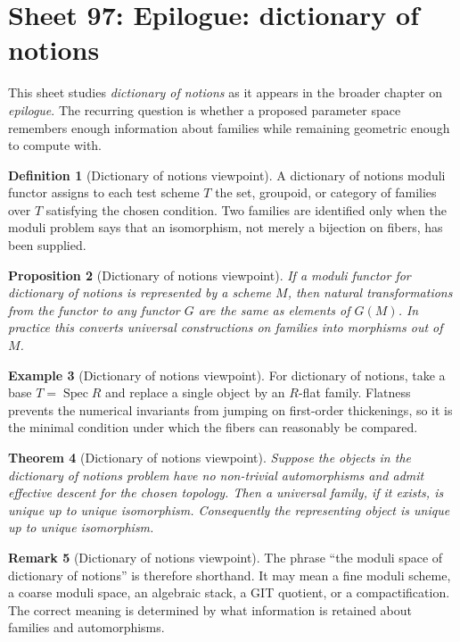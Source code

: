 \documentclass[11pt]{amsart}
\newtheorem{theorem}{Theorem}[section]
\newtheorem{proposition}[theorem]{Proposition}
\theoremstyle{definition}
\newtheorem{definition}[theorem]{Definition}
\newtheorem{example}[theorem]{Example}
\newtheorem{remark}[theorem]{Remark}
\newcommand{\Spec}{\operatorname{Spec}}
\begin{document}
\section{Sheet 97: Epilogue: dictionary of notions}
This sheet studies \emph{dictionary of notions} as it appears in the broader chapter on \emph{epilogue}.  The recurring question is whether a proposed parameter space remembers enough information about families while remaining geometric enough to compute with.
\begin{definition}[Dictionary of notions viewpoint]
A dictionary of notions moduli functor assigns to each test scheme $T$ the set, groupoid, or category of families over $T$ satisfying the chosen condition.  Two families are identified only when the moduli problem says that an isomorphism, not merely a bijection on fibers, has been supplied.
\end{definition}
\begin{proposition}[Dictionary of notions viewpoint]
If a moduli functor for dictionary of notions is represented by a scheme $M$, then natural transformations from the functor to any functor $G$ are the same as elements of $G(M)$.  In practice this converts universal constructions on families into morphisms out of $M$.
\end{proposition}
\begin{example}[Dictionary of notions viewpoint]
For dictionary of notions, take a base $T=\Spec R$ and replace a single object by an $R$-flat family.  Flatness prevents the numerical invariants from jumping on first-order thickenings, so it is the minimal condition under which the fibers can reasonably be compared.
\end{example}
\begin{theorem}[Dictionary of notions viewpoint]
Suppose the objects in the dictionary of notions problem have no non-trivial automorphisms and admit effective descent for the chosen topology.  Then a universal family, if it exists, is unique up to unique isomorphism.  Consequently the representing object is unique up to unique isomorphism.
\end{theorem}
\begin{remark}[Dictionary of notions viewpoint]
The phrase ``the moduli space of dictionary of notions'' is therefore shorthand.  It may mean a fine moduli scheme, a coarse moduli space, an algebraic stack, a GIT quotient, or a compactification.  The correct meaning is determined by what information is retained about families and automorphisms.
\end{remark}
\end{document}
